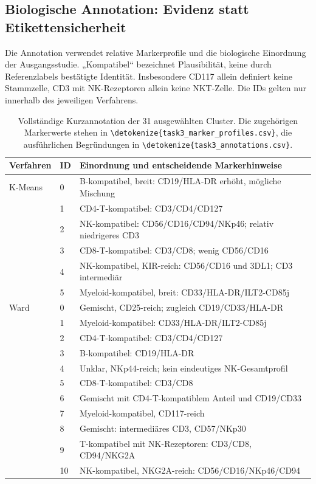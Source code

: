 \documentclass[11pt,a4paper]{article}
\newcommand{\code}[1]{\expandafter\nolinkurl\expandafter{\detokenize{#1}}}
\begin{document}
\subsection*{Biologische Annotation: Evidenz statt Etikettensicherheit}
Die Annotation verwendet relative Markerprofile und die biologische
Einordnung der Ausgangsstudie\cite{horowitz}. „Kompatibel“ bezeichnet
Plausibilität, keine durch Referenzlabels bestätigte Identität. Insbesondere
CD117 allein definiert keine Stammzelle, CD3 mit NK-Rezeptoren allein keine
NKT-Zelle. Die IDs gelten nur innerhalb des jeweiligen Verfahrens.
\begin{table}[!ht]\centering\small
\caption{Vollständige Kurzannotation der 31 ausgewählten Cluster.
Die zugehörigen Markerwerte stehen in \code{task3_marker_profiles.csv}, die
ausführlichen Begründungen in \code{task3_annotations.csv}.}
\begin{tabular}{p{2.3cm}p{1cm}p{11.8cm}}\toprule
Verfahren & ID & Einordnung und entscheidende Markerhinweise\\\midrule
K-Means & 0 & B-kompatibel, breit: CD19/HLA-DR erhöht, mögliche Mischung\\
 & 1 & CD4-T-kompatibel: CD3/CD4/CD127\\
 & 2 & NK-kompatibel: CD56/CD16/CD94/NKp46; relativ niedrigeres CD3\\
 & 3 & CD8-T-kompatibel: CD3/CD8; wenig CD56/CD16\\
 & 4 & NK-kompatibel, KIR-reich: CD56/CD16 und 3DL1; CD3 intermediär\\
 & 5 & Myeloid-kompatibel, breit: CD33/HLA-DR/ILT2-CD85j\\\midrule
Ward & 0 & Gemischt, CD25-reich; zugleich CD19/CD33/HLA-DR\\
 & 1 & Myeloid-kompatibel: CD33/HLA-DR/ILT2-CD85j\\
 & 2 & CD4-T-kompatibel: CD3/CD4/CD127\\
 & 3 & B-kompatibel: CD19/HLA-DR\\
 & 4 & Unklar, NKp44-reich; kein eindeutiges NK-Gesamtprofil\\
 & 5 & CD8-T-kompatibel: CD3/CD8\\
 & 6 & Gemischt mit CD4-T-kompatiblem Anteil und CD19/CD33\\
 & 7 & Myeloid-kompatibel, CD117-reich\\
 & 8 & Gemischt: intermediäres CD3, CD57/NKp30\\
 & 9 & T-kompatibel mit NK-Rezeptoren: CD3/CD8, CD94/NKG2A\\
 & 10 & NK-kompatibel, NKG2A-reich: CD56/CD16/NKp46/CD94\\

\end{tabular}
\end{table}
\end{document}
